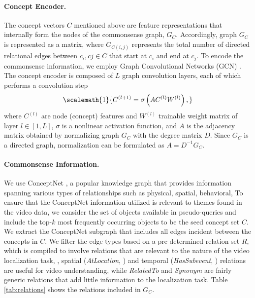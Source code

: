 \paragraph{Concept Encoder.}
The concept vectors \(C\) mentioned above are feature representations that internally form the nodes of the commonsense graph, \(G_C\). Accordingly, graph \(G_{C}\) is represented as a matrix, where \(G_{C(i,j)}\) represents the total number of directed relational edges between \(c_{i},c{j} \in C\) that start at \(c_i\) and end at \(c_j\). To encode the commonsense information, we employ Graph Convolutional Networks (GCN) \cite{hammond_wavelets_2011}. The concept encoder is composed of $L$ graph convolution layers, each of which performs a convolution step
\begin{equation}
\scalemath{1}{
    C^{\left(l+1\right)}=\sigma \left( AC^{\left(l\right) }W^{\left( l\right) }\right),
    }
\end{equation}
where $C^{\left(l\right)}$ are node (concept) features and $W^{\left( l\right)}$ trainable weight matrix of layer $l \in [1, L]$, $\sigma$ is a nonlinear activation function, and $A$ is the adjacency matrix obtained by normalizing graph $G_C$ with the degree matrix $D$. Since $G_C$ is a directed graph, normalization can be formulated as $A\!=\!D^{-1}G_{C}$.

\paragraph{Commonsense Information.}
We use ConceptNet \cite{speer_conceptnet_2017}, a popular knowledge graph that provides information spanning various types of relationships such as physical, spatial, behavioral, \etc To ensure that the ConceptNet information utilized is relevant to themes found in the video data, we consider the set of objects available in pseudo-queries and include the top-$k$ most frequently occurring objects to be the seed concept set \(C\). We extract the  ConceptNet subgraph that includes all edges incident between the concepts in \(C\). 
We filter the edge types based on a pre-determined relation set \(R\), which is compiled to involve relations that are relevant to the nature of the video localization task, \eg, spatial (\textit{AtLocation}, \etc) and temporal (\textit{HasSubevent}, \etc) relations are useful for video understanding, while \textit{RelatedTo} and \textit{Synonym} are fairly generic relations that add little information to the localization task. Table \ref{tab:relations} shows the relations included in \(G_C\).

